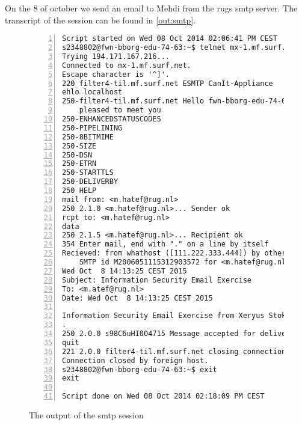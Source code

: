 On the 8 of october we send an email to Mehdi from the rugs smtp server. The transcript of the session can be found in \autoref{out:smtp}.

\begin{figure}[!htp]
\caption{The output of the smtp session}
\label{out:smtp}
\begin{Verbatim}[frame=single, numbers=left]
Script started on Wed 08 Oct 2014 02:06:41 PM CEST
s2348802@fwn-bborg-edu-74-63:~$ telnet mx-1.mf.surf.net 25
Trying 194.171.167.216...
Connected to mx-1.mf.surf.net.
Escape character is '^]'.
220 filter4-til.mf.surf.net ESMTP CanIt-Appliance
ehlo localhost
250-filter4-til.mf.surf.net Hello fwn-bborg-edu-74-63.fmnsedu.rug.nl [129.125.74.63], 
	pleased to meet you
250-ENHANCEDSTATUSCODES
250-PIPELINING
250-8BITMIME
250-SIZE
250-DSN
250-ETRN
250-STARTTLS
250-DELIVERBY
250 HELP
mail from: <m.hatef@rug.nl>
250 2.1.0 <m.hatef@rug.nl>... Sender ok
rcpt to: <m.hatef@rug.nl>
data
250 2.1.5 <m.hatef@rug.nl>... Recipient ok
354 Enter mail, end with "." on a line by itself
Recieved: from whathost ([111.222.333.444]) by other.host (SMSSMTP 4.1.0.19) with 
	SMTP id M2006051115312903572 for <m.hatef@rug.nl>;
Wed Oct  8 14:13:25 CEST 2015
Subject: Information Security Email Exercise
To: <m.atef@rug.nl>
Date: Wed Oct  8 14:13:25 CEST 2015

Information Security Email Exercise from Xeryus Stokkel and Rene Mellema
.
250 2.0.0 s98C6uHI004715 Message accepted for delivery
quit
221 2.0.0 filter4-til.mf.surf.net closing connection
Connection closed by foreign host.
s2348802@fwn-bborg-edu-74-63:~$ exit
exit

Script done on Wed 08 Oct 2014 02:18:09 PM CEST
\end{Verbatim}
\end{figure}
